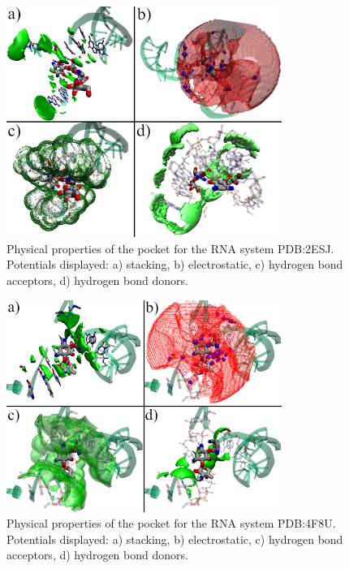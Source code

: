 \begin{figure}[H]
  \centering
  \includegraphics[width=0.8\textwidth]{figures/appendix/benchmark_rna/2esj.png}
  \caption{\label{fig:appx_benchmark/2esj} Physical properties of the pocket for the RNA system PDB:2ESJ. Potentials displayed: a) stacking, b) electrostatic, c) hydrogen bond acceptors, d) hydrogen bond donors.}
\end{figure}

\begin{figure}[H]
  \centering
  \includegraphics[width=0.8\textwidth]{figures/appendix/benchmark_rna/4f8u.png}
  \caption{\label{fig:appx_benchmark/4f8u} Physical properties of the pocket for the RNA system PDB:4F8U. Potentials displayed: a) stacking, b) electrostatic, c) hydrogen bond acceptors, d) hydrogen bond donors.}
\end{figure}

